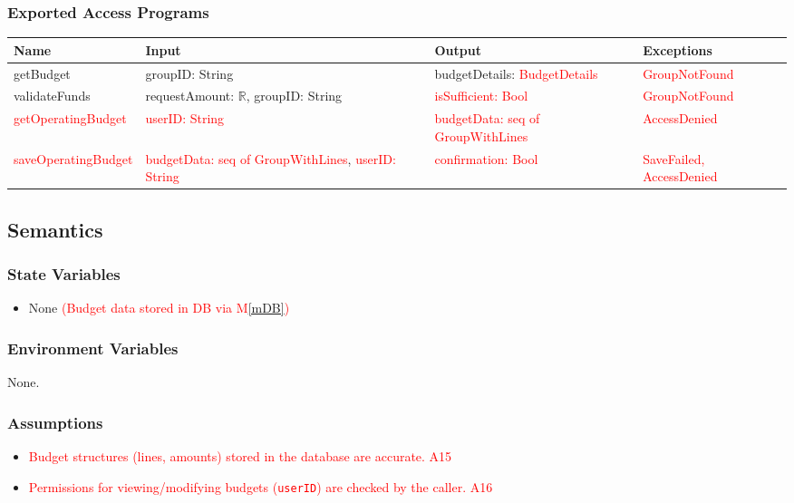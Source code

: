 \documentclass[12pt, titlepage]{article}
\providecommand{\mref}[1]{M\ref{#1}}
\begin{document}
\subsubsection{Exported Access Programs}
\begin{center}
    \scriptsize
    \begin{tabular}{|p{3cm}|p{4cm}|p{4cm}|p{4cm}|} %
        \hline
        \textbf{Name} & \textbf{Input} & \textbf{Output} & \textbf{Exceptions} \\
        \hline
        getBudget & groupID: String & budgetDetails: \textcolor{red}{BudgetDetails} & \textcolor{red}{GroupNotFound} \\
        \hline
        validateFunds & requestAmount: $\mathbb{R}$, groupID: String & \textcolor{red}{isSufficient: Bool} & \textcolor{red}{GroupNotFound} \\
        \hline
        \textcolor{red}{getOperatingBudget} & \textcolor{red}{userID: String} & \textcolor{red}{budgetData: seq of GroupWithLines} & \textcolor{red}{AccessDenied} \\ %
        \hline
        \textcolor{red}{saveOperatingBudget} & \textcolor{red}{budgetData: seq of GroupWithLines}, \textcolor{red}{userID: String} & \textcolor{red}{confirmation: Bool} & \textcolor{red}{SaveFailed, AccessDenied} \\ %
        \hline
    \end{tabular}
\end{center}

\subsection{Semantics}
\subsubsection{State Variables}
\begin{itemize}
    \item None \textcolor{red}{(Budget data stored in DB via \mref{mDB})}
\end{itemize}

\subsubsection{Environment Variables}
None.

\subsubsection{Assumptions}
\begin{itemize}
    \item \textcolor{red}{Budget structures (lines, amounts) stored in the database are accurate. A15}
    \item \textcolor{red}{Permissions for viewing/modifying budgets (\texttt{userID}) are checked by the caller. A16}
\end{itemize}
\end{document}
